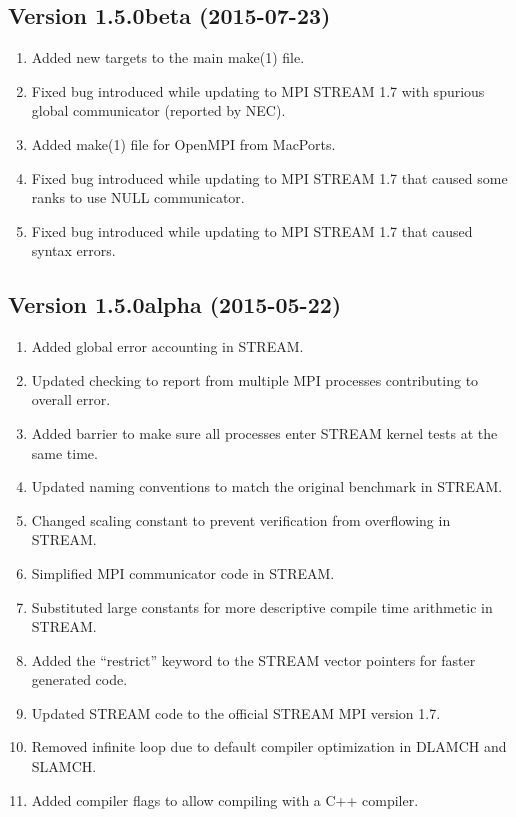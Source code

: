 \documentclass[twocolumn]{article}
\begin{document}
\subsection{Version 1.5.0beta (2015-07-23)}
\begin{enumerate}
  \item Added new targets to the main make(1) file.
  \item Fixed bug introduced while updating to MPI STREAM 1.7 with spurious global communicator (reported by NEC).
  \item Added make(1) file for OpenMPI from MacPorts.
  \item Fixed bug introduced while updating to MPI STREAM 1.7 that caused some ranks to use NULL communicator.
  \item Fixed bug introduced while updating to MPI STREAM 1.7 that caused syntax errors.
\end{enumerate}

\subsection{Version 1.5.0alpha (2015-05-22)}
\begin{enumerate}
  \item Added global error accounting in STREAM.
  \item Updated checking to report from multiple MPI processes contributing to overall error.
  \item Added barrier to make sure all processes enter STREAM kernel tests at the same time.
  \item Updated naming conventions to match the original benchmark in STREAM.
  \item Changed scaling constant to prevent verification from overflowing in STREAM.
  \item Simplified MPI communicator code in STREAM.
  \item Substituted large constants for more descriptive compile time arithmetic in STREAM.
  \item Added the ``restrict'' keyword to the STREAM vector pointers for faster generated code.
  \item Updated STREAM code to the official STREAM MPI version 1.7.
  \item Removed infinite loop due to default compiler optimization in DLAMCH and SLAMCH.
  \item Added compiler flags to allow compiling with a C++ compiler.
\end{enumerate}
\end{document}
